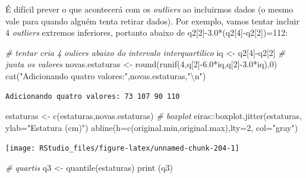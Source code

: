 \documentclass[
]{article}
\newenvironment{Shaded}{\begin{snugshade}}{\end{snugshade}}
\newcommand{\AttributeTok}[1]{\textcolor[rgb]{0.77,0.63,0.00}{#1}}
\newcommand{\CommentTok}[1]{\textcolor[rgb]{0.56,0.35,0.01}{\textit{#1}}}
\newcommand{\DecValTok}[1]{\textcolor[rgb]{0.00,0.00,0.81}{#1}}
\newcommand{\FloatTok}[1]{\textcolor[rgb]{0.00,0.00,0.81}{#1}}
\newcommand{\FunctionTok}[1]{\textcolor[rgb]{0.00,0.00,0.00}{#1}}
\newcommand{\NormalTok}[1]{#1}
\newcommand{\OtherTok}[1]{\textcolor[rgb]{0.56,0.35,0.01}{#1}}
\newcommand{\SpecialCharTok}[1]{\textcolor[rgb]{0.00,0.00,0.00}{#1}}
\newcommand{\StringTok}[1]{\textcolor[rgb]{0.31,0.60,0.02}{#1}}
\begin{document}
É difícil prever o que acontecerá com os \emph{outliers} ao incluirmos
dados (o mesmo vale para quando alguém tenta retirar dados). Por
exemplo, vamos tentar incluir 4 \emph{outliers} extremos inferiores,
portanto abaixo de q2{[}2{]}-3.0*(q2{[}4{]}-q2{[}2{]})=112:

\begin{Shaded}
\begin{Highlighting}[]
\CommentTok{\# tentar cria 4 ouliers abaixo do intervalo interquartilico}
\NormalTok{iq }\OtherTok{\textless{}{-}}\NormalTok{ q2[}\DecValTok{4}\NormalTok{]}\SpecialCharTok{{-}}\NormalTok{q2[}\DecValTok{2}\NormalTok{]}
\CommentTok{\# junta os valores }
\NormalTok{novas.estaturas }\OtherTok{\textless{}{-}} \FunctionTok{round}\NormalTok{(}\FunctionTok{runif}\NormalTok{(}\DecValTok{4}\NormalTok{,q[}\DecValTok{2}\NormalTok{]}\SpecialCharTok{{-}}\FloatTok{6.0}\SpecialCharTok{*}\NormalTok{iq,q[}\DecValTok{2}\NormalTok{]}\SpecialCharTok{{-}}\FloatTok{3.0}\SpecialCharTok{*}\NormalTok{iq),}\DecValTok{0}\NormalTok{)}
\FunctionTok{cat}\NormalTok{(}\StringTok{"Adicionando quatro valores:"}\NormalTok{,novas.estaturas,}\StringTok{"}\SpecialCharTok{\textbackslash{}n}\StringTok{"}\NormalTok{)}
\end{Highlighting}
\end{Shaded}

\begin{verbatim}
Adicionando quatro valores: 73 107 90 110 
\end{verbatim}

\begin{Shaded}
\begin{Highlighting}[]
\NormalTok{estaturas }\OtherTok{\textless{}{-}} \FunctionTok{c}\NormalTok{(estaturas,novas.estaturas)}
\CommentTok{\# boxplot}
\NormalTok{eiras}\SpecialCharTok{::}\FunctionTok{boxplot.jitter}\NormalTok{(estaturas, }\AttributeTok{ylab=}\StringTok{"Estatura (cm)"}\NormalTok{)}
\FunctionTok{abline}\NormalTok{(}\AttributeTok{h=}\FunctionTok{c}\NormalTok{(original.min,original.max),}\AttributeTok{lty=}\DecValTok{2}\NormalTok{, }\AttributeTok{col=}\StringTok{"gray"}\NormalTok{)}
\end{Highlighting}
\end{Shaded}

\begin{center}\texttt{[image: RStudio\_files/figure-latex/unnamed-chunk-204-1]} \end{center}

\begin{Shaded}
\begin{Highlighting}[]
\CommentTok{\# quartis}
\NormalTok{q3 }\OtherTok{\textless{}{-}} \FunctionTok{quantile}\NormalTok{(estaturas)}
\FunctionTok{print}\NormalTok{ (q3)}
\end{Highlighting}
\end{Shaded}
\end{document}
